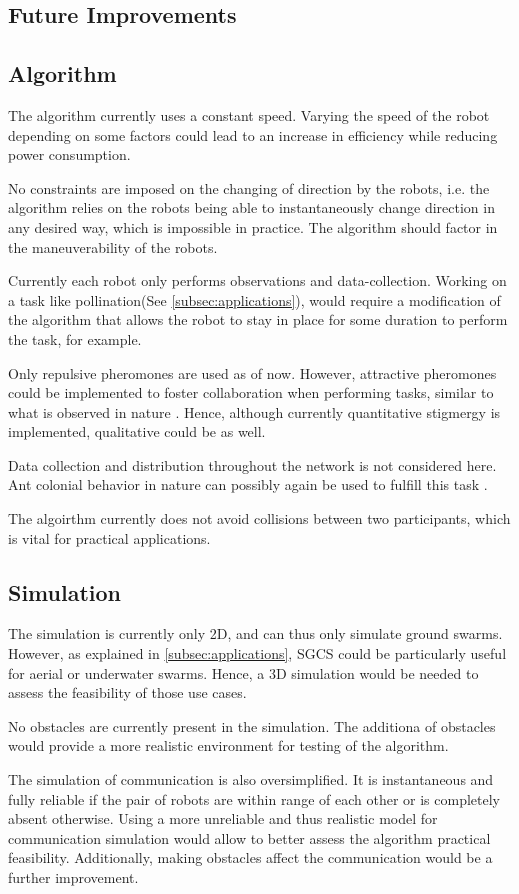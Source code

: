 \documentclass[a4paper, 12pt, times]{article}
\begin{document}
\begin{multicols}{2}
\section{Future Improvements} 
\subsection{Algorithm}
The algorithm currently uses a constant speed. Varying the speed of the robot depending on some factors could lead to an increase in efficiency while reducing power consumption. 
\par No constraints are imposed on the changing of direction by the robots, i.e. the algorithm relies on the robots being able to instantaneously change direction in any desired way, which is impossible in practice. The algorithm should factor in the maneuverability of the robots.
\par Currently each robot only performs observations and data-collection. Working on a task like pollination(See \ref{subsec:applications}), would require a modification of the algorithm that allows the robot to stay in place for some duration to perform the task, for example.
\par Only repulsive pheromones are used as of now. However, attractive pheromones could be implemented to foster collaboration when performing tasks, similar to what is observed in nature \parencite{david_morgan_trail_2009}. Hence, although currently quantitative stigmergy is implemented, qualitative could be as well.
\par Data collection and distribution throughout the network is not considered here. Ant colonial behavior in nature can possibly again be used to fulfill this task \parencite{adler_information_1992}.
\par The algoirthm currently does not avoid collisions between two participants, which is vital for practical applications.
\subsection{Simulation}
The simulation is currently only 2D, and can thus only simulate ground swarms. However, as explained in \ref{subsec:applications}, SGCS could be particularly useful for aerial or underwater swarms. Hence, a 3D simulation would be needed to assess the feasibility of those use cases.
\par No obstacles are currently present in the simulation. The additiona of obstacles would provide a more realistic environment for testing of the algorithm.
\par The simulation of communication is also oversimplified. It is instantaneous and fully reliable if the pair of robots are within range of each other or is completely absent otherwise. Using a more unreliable and thus realistic model for communication simulation would allow to better assess the algorithm practical feasibility. Additionally, making obstacles affect the communication would be a further improvement.

\end{multicols}
\end{document}
